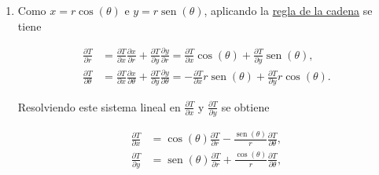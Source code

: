 \documentclass[
  spanish,
  a4paper,
]{scrreport}
\theoremstyle{definition}
\theoremstyle{remark}
\begin{document}
\begin{tcolorbox}
\begin{enumerate}
  Al movernos en dirección radial, manteniendo \(\theta\) y \(z\)
  constantes, nos desplazamos en línea recta alejándonos del eje, y cada
  unidad de \(r\) es un metro recorrido, por lo que la tasa de variación
  instantánea de la temperatura con el movimiento radial es
  \(\frac{\partial T}{\partial r} = 4\ ^\circ\mathrm{C/m}\), es decir,
  la temperatura aumenta 4 °C por cada metro que nos alejamos del eje.

  Al movernos en dirección angular, manteniendo \(r\) y \(z\)
  constantes, la tasa de variación de la temperatura por cada radián
  girado es
  \(\frac{\partial T}{\partial \theta} = -4\ ^\circ\mathrm{C/rad}\).
  Pero al girar un radián a una distancia \(r\) del eje se recorre un
  arco de \(r\) metros, de manera que la tasa de variación por cada
  metro recorrido es

  \[
  \frac{1}{r}\frac{\partial T}{\partial \theta} = \frac{-4}{2} = -2\ ^\circ\mathrm{C/m},
  \]

  es decir, la temperatura disminuye 2 °C por cada metro recorrido al
  girar alrededor del eje en sentido antihorario, ya que nos alejamos
  del lado soleado de la torre (\(\theta = 0\)).
\item
  Como \(x = r\cos(\theta)\) e \(y = r\operatorname{sen}(\theta)\),
  aplicando la
  \href{https://aprendeconalf.es/analisis-manual/13-derivadas-funciones-varias-variables.html\#thm-regla-cadena-funciones-varias-variables}{regla
  de la cadena} se tiene

  \begin{align*}
  \frac{\partial T}{\partial r} &= \frac{\partial T}{\partial x}\frac{\partial x}{\partial r} + \frac{\partial T}{\partial y}\frac{\partial y}{\partial r} = \frac{\partial T}{\partial x}\cos(\theta) + \frac{\partial T}{\partial y}\operatorname{sen}(\theta), \\
  \frac{\partial T}{\partial \theta} &= \frac{\partial T}{\partial x}\frac{\partial x}{\partial \theta} + \frac{\partial T}{\partial y}\frac{\partial y}{\partial \theta} = -\frac{\partial T}{\partial x}r\operatorname{sen}(\theta) + \frac{\partial T}{\partial y}r\cos(\theta).
  \end{align*}

  Resolviendo este sistema lineal en \(\frac{\partial T}{\partial x}\) y
  \(\frac{\partial T}{\partial y}\) se obtiene

  \begin{align*}
  \frac{\partial T}{\partial x} &= \cos(\theta)\frac{\partial T}{\partial r} - \frac{\operatorname{sen}(\theta)}{r}\frac{\partial T}{\partial \theta}, \\
  \frac{\partial T}{\partial y} &= \operatorname{sen}(\theta)\frac{\partial T}{\partial r} + \frac{\cos(\theta)}{r}\frac{\partial T}{\partial \theta},
  \end{align*}


\end{enumerate}
\end{tcolorbox}
\end{document}
